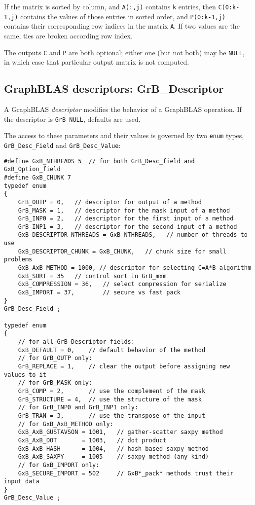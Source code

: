 \documentclass[12pt]{article}
\begin{document}
{If the matrix is sorted by column, and \verb'A(:,j)' contains \verb'k' entries,
then \verb'C(0:k-1,j)' contains the values of those entries in sorted order,
and \verb'P(0:k-1,j)' contains their corresponding row indices in the matrix
\verb'A'.  If two values are the same, ties are broken according row index.

The outputs \verb'C' and \verb'P' are both optional; either one (but not both)
may be \verb'NULL', in which case that particular output matrix is not
computed.

\newpage
\subsection{GraphBLAS descriptors: {\sf GrB\_Descriptor}} %
\label{descriptor}

A GraphBLAS {\em descriptor} modifies the behavior of a GraphBLAS operation.
If the descriptor is \verb'GrB_NULL', defaults are used.

The access to these parameters and their values is governed
by two \verb'enum' types, \verb'GrB_Desc_Field' and \verb'GrB_Desc_Value':

\begin{mdframed}[userdefinedwidth=6in]
{\footnotesize
\begin{verbatim}
#define GxB_NTHREADS 5  // for both GrB_Desc_field and GxB_Option_field
#define GxB_CHUNK 7
typedef enum
{
    GrB_OUTP = 0,   // descriptor for output of a method
    GrB_MASK = 1,   // descriptor for the mask input of a method
    GrB_INP0 = 2,   // descriptor for the first input of a method
    GrB_INP1 = 3,   // descriptor for the second input of a method
    GxB_DESCRIPTOR_NTHREADS = GxB_NTHREADS,   // number of threads to use
    GxB_DESCRIPTOR_CHUNK = GxB_CHUNK,   // chunk size for small problems
    GxB_AxB_METHOD = 1000, // descriptor for selecting C=A*B algorithm
    GxB_SORT = 35   // control sort in GrB_mxm
    GxB_COMPRESSION = 36,   // select compression for serialize
    GxB_IMPORT = 37,        // secure vs fast pack
}
GrB_Desc_Field ;

typedef enum
{
    // for all GrB_Descriptor fields:
    GxB_DEFAULT = 0,    // default behavior of the method
    // for GrB_OUTP only:
    GrB_REPLACE = 1,    // clear the output before assigning new values to it
    // for GrB_MASK only:
    GrB_COMP = 2,       // use the complement of the mask
    GrB_STRUCTURE = 4,  // use the structure of the mask
    // for GrB_INP0 and GrB_INP1 only:
    GrB_TRAN = 3,       // use the transpose of the input
    // for GxB_AxB_METHOD only:
    GxB_AxB_GUSTAVSON = 1001,   // gather-scatter saxpy method
    GxB_AxB_DOT       = 1003,   // dot product
    GxB_AxB_HASH      = 1004,   // hash-based saxpy method
    GxB_AxB_SAXPY     = 1005    // saxpy method (any kind)
    // for GxB_IMPORT only:
    GxB_SECURE_IMPORT = 502     // GxB*_pack* methods trust their input data
}
GrB_Desc_Value ;
\end{verbatim} } \end{mdframed}

}
\end{document}
